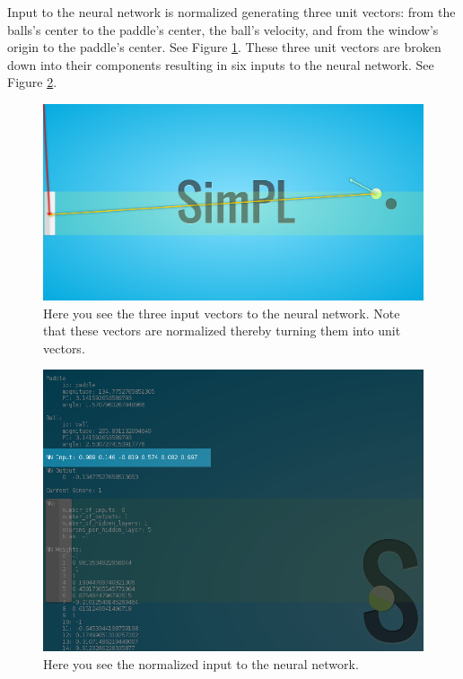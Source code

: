 \documentclass[a4paper,10pt]{article}
\begin{document}
Input to the neural network is normalized generating three unit vectors: from the balls's center to the paddle's center, the ball's velocity, and from the window's origin to the paddle's center. See Figure \ref{fig:unit_vectors}. These three unit vectors are broken down into their components resulting in six inputs to the neural network. See Figure \ref{fig:nn_input}. 

\begin{figure}[H]  
  \centering
  \includegraphics[width=1\textwidth]{figures/unit_vectors.png}
  \caption{Here you see the three input vectors to the neural network. Note that these vectors are normalized thereby turning them into unit vectors.}
  \label{fig:unit_vectors}
\end{figure}

\begin{figure}[H]  
  \centering
  \includegraphics[width=1\textwidth]{figures/nn_input.png}
  \caption{Here you see the normalized input to the neural network.}
  \label{fig:nn_input}
\end{figure}
\end{document}
